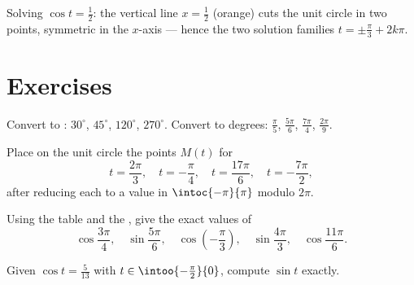 \begin{omfigure}

{\small Solving $\cos t = \frac12$: the vertical line $x = \frac12$
(orange) cuts the unit circle in two points, symmetric in the $x$-axis
--- hence the two solution families $t = \pm\frac\pi3 + 2k\pi$.}
\end{omfigure}

\section{Exercises}

\begin{exercise}[$\star$]\label{exo:g11:trigo:1}
Convert to : $30^\circ$, $45^\circ$, $120^\circ$, $270^\circ$.
Convert to degrees: $\frac{\pi}{5}$, $\frac{5\pi}{6}$, $\frac{7\pi}{4}$,
$\frac{2\pi}{9}$.
\end{exercise}

\begin{exercise}[$\star$]\label{exo:g11:trigo:2}
Place on the unit circle the points $M(t)$ for
\[
t = \frac{2\pi}{3},\quad
t = -\frac{\pi}{4},\quad
t = \frac{17\pi}{6},\quad
t = -\frac{7\pi}{2},
\]
after reducing each to a value in $\intoc{-\pi}{\pi}$ modulo $2\pi$.
\end{exercise}

\begin{exercise}[$\star$]\label{exo:g11:trigo:3}
Using the table and the , give the exact values of
\[
\cos\frac{3\pi}{4}, \quad
\sin\frac{5\pi}{6}, \quad
\cos\left(-\frac{\pi}{3}\right), \quad
\sin\frac{4\pi}{3}, \quad
\cos\frac{11\pi}{6} .
\]
\end{exercise}

\begin{exercise}[$\star$]\label{exo:g11:trigo:4}
Given $\cos t = \frac{5}{13}$ with $t \in \intoo{-\frac\pi2}{0}$, compute
$\sin t$ exactly.
\end{exercise}

